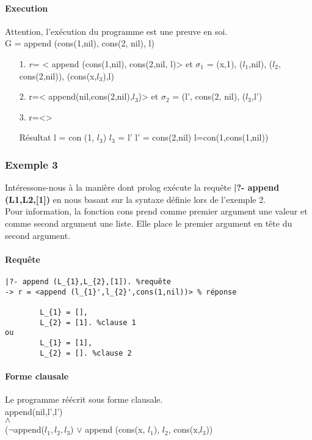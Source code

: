\paragraph{Execution}
Attention, l'exécution du programme est une preuve en soi.\\
G = append (cons(1,nil), cons(2, nil), l)
\begin{itemize}
\item[1.] 
		$r$= < append (cons(1,nil), cons(2,nil, l)> et
		$\sigma_1$ = {(x,1), ($l_1$,nil), ($l_2$, cons(2,nil)), (cons(x,$l_3$),l)}
\item[2.]
		r=< append(nil,cons(2,nil),$l_3$)> et
		$\sigma_2$ = { (l', cons(2, nil), ($l_3$,l') }
		
\item[3.]
		r=<>
		
\item[Résultat]
l = con (1, $l_3$)
$l_3$ = l'
l' = cons(2,nil)
l=con(1,cons(1,nil))


\end{itemize}

\subsubsection{Exemple 3}

Intéressons-nous à la manière dont prolog exécute la requête \textbf{|?- append (L1,L2,[1])} en nous basant sur la syntaxe définie lors de l'exemple 2.\\
Pour information, la fonction cons prend comme premier argument une valeur et comme second argument une liste. Elle place le premier argument en tête du second argument.\\

\paragraph{Requête}
\begin{verbatim} 
|?- append (L_{1},L_{2},[1]). %requête
-> r = <append (l_{1}',l_{2}',cons(1,nil))> % réponse

		L_{1} = [],
		L_{2} = [1]. %clause 1
ou		
		L_{1} = [1],
		L_{2} = []. %clause 2
\end{verbatim}

\paragraph{Forme clausale}
Le programme réécrit sous forme clausale.\\
append(nil,l',l')\\
$\land$\\
($\neg$append($l_{1},l_{2},l_{3}$)
$\vee$ append (cons(x, $l_{1}$), $l_{2}$, cons(x,$l_{3}$))

